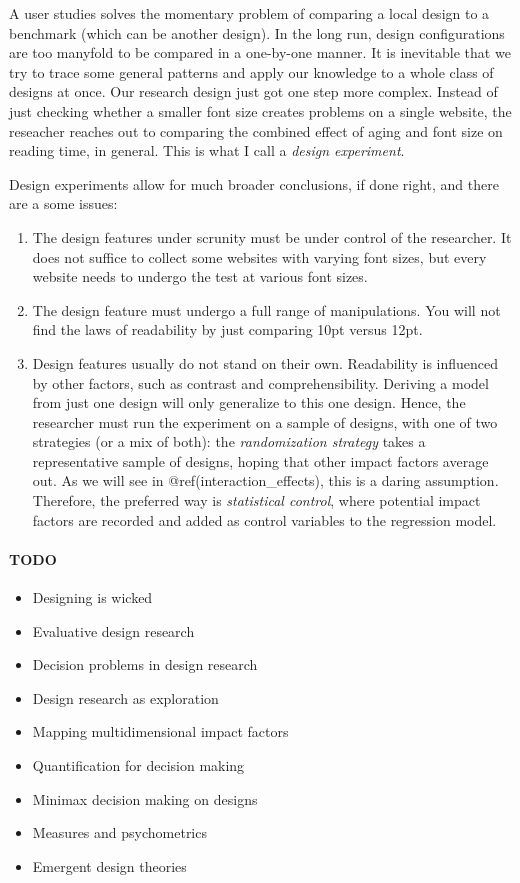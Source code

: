 \documentclass[]{svmono}
\providecommand{\tightlist}{%
  \setlength{\itemsep}{0pt}\setlength{\parskip}{0pt}}
\let\oldparagraph\paragraph
\renewcommand{\paragraph}[1]{\oldparagraph{#1}\mbox{}}
\begin{document}
A user studies solves the momentary problem of comparing a local design
to a benchmark (which can be another design). In the long run, design
configurations are too manyfold to be compared in a one-by-one manner.
It is inevitable that we try to trace some general patterns and apply
our knowledge to a whole class of designs at once. Our research design
just got one step more complex. Instead of just checking whether a
smaller font size creates problems on a single website, the reseacher
reaches out to comparing the combined effect of aging and font size on
reading time, in general. This is what I call a \emph{design
experiment}.

Design experiments allow for much broader conclusions, if done right,
and there are a some issues:

\begin{enumerate}
\def\labelenumi{\arabic{enumi}.}
\tightlist
\item
  The design features under scrunity must be under control of the
  researcher. It does not suffice to collect some websites with varying
  font sizes, but every website needs to undergo the test at various
  font sizes.
\item
  The design feature must undergo a full range of manipulations. You
  will not find the laws of readability by just comparing 10pt versus
  12pt.
\item
  Design features usually do not stand on their own. Readability is
  influenced by other factors, such as contrast and comprehensibility.
  Deriving a model from just one design will only generalize to this one
  design. Hence, the researcher must run the experiment on a sample of
  designs, with one of two strategies (or a mix of both): the
  \emph{randomization strategy} takes a representative sample of
  designs, hoping that other impact factors average out. As we will see
  in @ref(interaction\_effects), this is a daring assumption. Therefore,
  the preferred way is \emph{statistical control}, where potential
  impact factors are recorded and added as control variables to the
  regression model.
\end{enumerate}

\paragraph{TODO}\label{todo}

\begin{itemize}
\tightlist
\item
  Designing is wicked
\item
  Evaluative design research
\item
  Decision problems in design research
\item
  Design research as exploration
\item
  Mapping multidimensional impact factors
\item
  Quantification for decision making
\item
  Minimax decision making on designs
\item
  Measures and psychometrics
\item
  Emergent design theories
\end{itemize}
\end{document}
